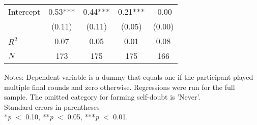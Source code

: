 \begin{table}[htbp]
\begin{threeparttable}
\begin{tabular}{l cccc}
Intercept           &        0.53***&        0.44***&        0.21***&       -0.00   \\
                    &      (0.11)   &      (0.11)   &      (0.05)   &      (0.00)   \\
\hline
$R^2$               &        0.07   &        0.05   &        0.01   &        0.08   \\
$N$                 &         173   &         175   &         175   &         166   \\
\hline
\hline
\end{tabular}
\begin{tablenotes}
\footnotesize
\item{Notes: Dependent variable is a dummy that equals one if the                 participant played multiple final rounds and zero otherwise.                 Regressions were run for the full sample. The omitted category for                 farming self-doubt is 'Never'.                 \\ Standard errors in parentheses                 \\ *\textit{p} $<$ 0.10, **\textit{p} $<$ 0.05, ***\textit{p} $<$ 0.01.}
\end{tablenotes}
\end{threeparttable}
\end{table}
